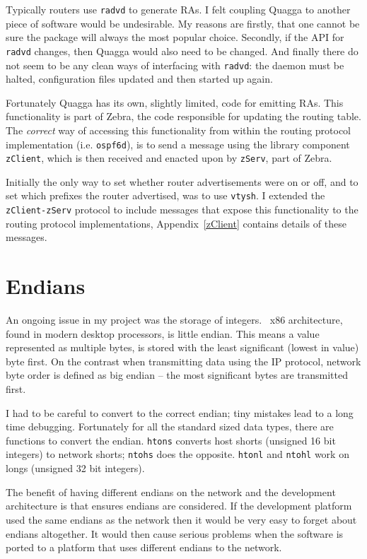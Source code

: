 \documentclass[12pt,a4paper,twoside]{report}
\begin{document}
Typically routers use \texttt{radvd}  to generate RAs. I felt coupling Quagga to another
piece of software would be undesirable. My reasons are firstly, that one cannot
be sure the package will always the most popular choice. Secondly, if the
API for \texttt{radvd} changes, then Quagga would also need to be changed. And
finally there do not seem to be any clean ways of interfacing with
\texttt{radvd}: the daemon must be halted, configuration files updated and then
started up again.

Fortunately Quagga has its own, slightly limited, code for emitting RAs. This
functionality is part of Zebra, the code responsible for updating the routing
table. The \emph{correct} way of accessing this functionality from within the
routing protocol implementation (i.e. \texttt{ospf6d}), is to send a message
using the library component \texttt{zClient}, which is then received and
enacted upon by \texttt{zServ}, part of Zebra. 

Initially the only way to set whether router advertisements were on or off, and
to set which prefixes the router advertised, was to use \texttt{vtysh}. I
extended the \texttt{zClient-zServ} protocol to include messages that expose
this functionality to the routing protocol implementations,
Appendix~\ref{zClient} contains details of these messages. 

\section{Endians}
An ongoing issue in my project was the storage of integers.  \ x86
architecture, found in modern desktop processors, is little endian.  This means
a value represented as multiple bytes, is stored with the least significant
(lowest in value) byte first. On the contrast when transmitting data using the
IP protocol, network byte order is defined as big endian -- the most
significant bytes are transmitted first. 

I had to be careful to convert to the correct endian; tiny mistakes lead
to a long time debugging. Fortunately for all the standard sized data types,
there are functions to convert the endian.  \texttt{htons} converts host shorts
(unsigned 16 bit integers) to network shorts; \texttt{ntohs} does the opposite.
\texttt{htonl} and \texttt{ntohl} work on longs (unsigned 32 bit integers). 

The benefit of having different endians on the network and the development
architecture is that ensures endians are considered. If the development platform
used the same endians as the network then it would be very easy to forget about
endians altogether. It would then cause serious problems when the software is
ported to a platform that uses different endians to the network.
    
\end{document}

